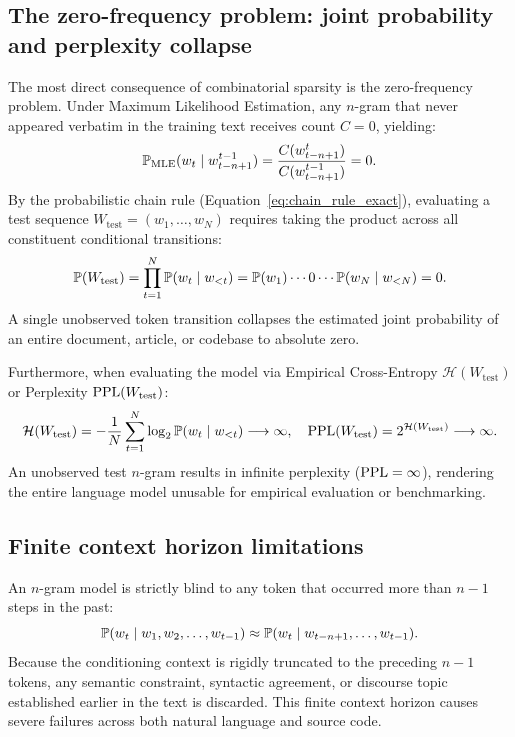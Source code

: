 \documentclass[../../main.tex]{subfiles}
\begin{document}
\subsection{The zero-frequency problem: joint probability and perplexity collapse}
\label{subsec:zero_freq_collapse}
The most direct consequence of combinatorial sparsity is the zero-frequency problem. Under Maximum Likelihood Estimation, any $n$-gram that never appeared verbatim in the training text receives count $C = 0$, yielding:
\begin{equation}
\label{eq:zero_mle}
\mathbb{P}_{\text{MLE}}(w_t \mid w_{t-n+1}^{t-1}) = \frac{C(w_{t-n+1}^t)}{C(w_{t-n+1}^{t-1})} = 0.
\end{equation}
By the probabilistic chain rule (Equation~\eqref{eq:chain_rule_exact}), evaluating a test sequence $W_{\text{test}} = (w_1, \dots, w_N)$ requires taking the product across all constituent conditional transitions:
\begin{equation}
\label{eq:chain_rule_zero_collapse}
\mathbb{P}(W_{\text{test}}) = \prod_{t=1}^N \mathbb{P}(w_t \mid w_{<t}) = \mathbb{P}(w_1) \cdots 0 \cdots \mathbb{P}(w_N \mid w_{<N}) = 0.
\end{equation}
A single unobserved token transition collapses the estimated joint probability of an entire document, article, or codebase to absolute zero.

Furthermore, when evaluating the model via Empirical Cross-Entropy $\mathcal{H}(W_{\text{test}})$ or Perplexity $\mathrm{PPL}(W_{\text{test}})$:
\begin{equation}
\label{eq:ppl_zero_collapse}
\mathcal{H}(W_{\text{test}}) = -\frac{1}{N} \sum_{t=1}^N \log_2 \mathbb{P}(w_t \mid w_{<t}) \longrightarrow \infty, \quad \mathrm{PPL}(W_{\text{test}}) = 2^{\mathcal{H}(W_{\text{test}})} \longrightarrow \infty.
\end{equation}
An unobserved test $n$-gram results in infinite perplexity ($\mathrm{PPL} = \infty$), rendering the entire language model unusable for empirical evaluation or benchmarking.

\subsection{Finite context horizon limitations}
An $n$-gram model is strictly blind to any token that occurred more than $n-1$ steps in the past:
\begin{equation}
\label{eq:context_truncation}
\mathbb{P}(w_t \mid w_1, w_2, \dots, w_{t-1}) \approx \mathbb{P}(w_t \mid w_{t-n+1}, \dots, w_{t-1}).
\end{equation}
Because the conditioning context is rigidly truncated to the preceding $n-1$ tokens, any semantic constraint, syntactic agreement, or discourse topic established earlier in the text is discarded. This finite context horizon causes severe failures across both natural language and source code.
\end{document}
